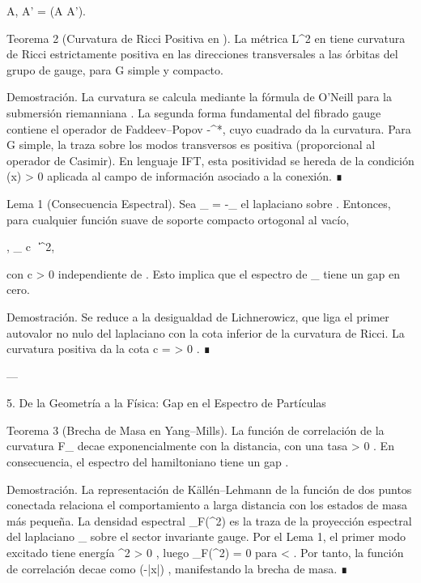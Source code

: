 \documentclass[12pt,twoside]{book}
\begin{document}
\langle \delta A, \delta A' \rangle = \int {}(\delta A \wedge * \delta A').

Teorema 2 (Curvatura de Ricci Positiva en   ).
La métrica  L^2  en    tiene curvatura de Ricci estrictamente positiva en las direcciones transversales a las órbitas del grupo de gauge, para  G  simple y compacto.

Demostración. La curvatura se calcula mediante la fórmula de O’Neill para la submersión riemanniana   \to {} . La segunda forma fundamental del fibrado gauge contiene el operador de Faddeev–Popov  -\nabla^*\nabla , cuyo cuadrado da la curvatura. Para  G  simple, la traza sobre los modos transversos es positiva (proporcional al operador de Casimir). En lenguaje IFT, esta positividad se hereda de la condición  \rho(x) > 0  aplicada al campo de información asociado a la conexión. ∎

Lema 1 (Consecuencia Espectral).
Sea  _{} = -\Delta_{}  el laplaciano sobre   . Entonces, para cualquier función suave de soporte compacto  \psi  ortogonal al vacío,

\langle \psi, _{} \psi \rangle \ge c \, \|\psi\|^2,

con  c > 0  independiente de  \psi . Esto implica que el espectro de  _{}  tiene un gap en cero.

Demostración. Se reduce a la desigualdad de Lichnerowicz, que liga el primer autovalor no nulo del laplaciano con la cota inferior de la curvatura de Ricci. La curvatura positiva da la cota  c = \inf {} > 0 . ∎

---

5. De la Geometría a la Física: Gap en el Espectro de Partículas

Teorema 3 (Brecha de Masa en Yang–Mills).
La función de correlación de la curvatura  F_{\mu\nu}  decae exponencialmente con la distancia, con una tasa  \Delta > 0 . En consecuencia, el espectro del hamiltoniano tiene un gap  \Delta .

Demostración. La representación de Källén–Lehmann de la función de dos puntos conectada relaciona el comportamiento a larga distancia con los estados de masa más pequeña. La densidad espectral  \rho_F(\mu^2)  es la traza de la proyección espectral del laplaciano  _{}  sobre el sector invariante gauge. Por el Lema 1, el primer modo excitado tiene energía  \Delta^2 > 0 , luego  \rho_F(\mu^2) = 0  para  \mu < \Delta . Por tanto, la función de correlación decae como  \exp(-\Delta |x|) , manifestando la brecha de masa. ∎
\end{document}
